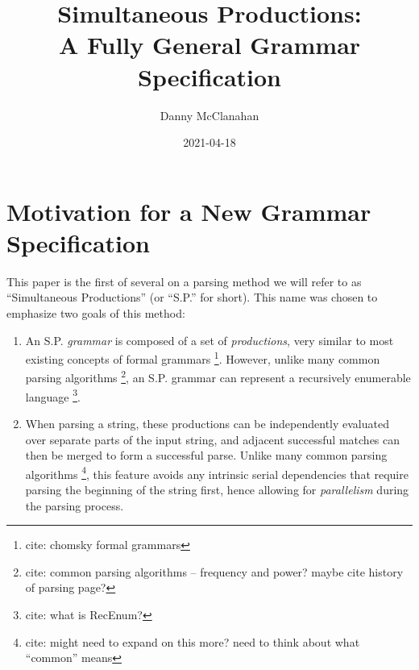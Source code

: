 \documentclass[10pt]{article}
\title{Simultaneous Productions: \\ A Fully General Grammar Specification}
\date{2021-04-18}
\author{Danny McClanahan}
\newcommand{\todocite}[1]{\footnote{cite: #1}}
\begin{document}
\maketitle

\section{Motivation for a New Grammar Specification}
\label{sec:motivation}

This paper is the first of several on a parsing method we will refer to as ``Simultaneous Productions'' (or ``S.P.'' for short). This name was chosen to emphasize two goals of this method:
\begin{enumerate}
  \item An S.P. \textit{grammar} is composed of a set of \textit{productions}, very similar to most existing concepts of formal grammars \todocite{chomsky formal grammars}. However, unlike many common parsing algorithms \todocite{common parsing algorithms -- frequency and power? maybe cite history of parsing page?}, an S.P. grammar can represent a recursively enumerable language \todocite{what is RecEnum?}.
  \item When parsing a string, these productions can be independently evaluated over separate parts of the input string, and adjacent successful matches can then be merged to form a successful parse. Unlike many common parsing algorithms \todocite{might need to expand on this more? need to think about what ``common'' means}, this feature avoids any intrinsic serial dependencies that require parsing the beginning of the string first, hence allowing for \textit{parallelism} during the parsing process.
\end{enumerate}
\end{document}
